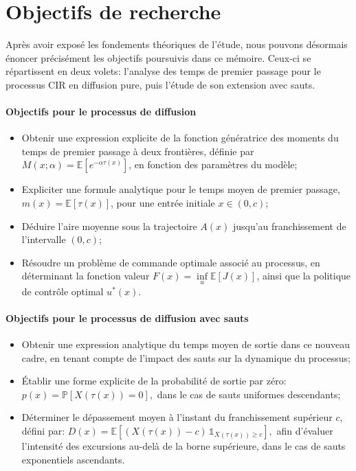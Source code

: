 \section{Objectifs de recherche}  %

Après avoir exposé les fondements théoriques de l'étude, nous pouvons désormais énoncer précisément les objectifs poursuivis dans ce mémoire. Ceux-ci se répartissent en deux volets: l'analyse des temps de premier passage pour le processus \acs{CIR} en diffusion pure, puis l'étude de son extension avec sauts.
\paragraph{Objectifs pour le processus de diffusion}
\begin{itemize}
    \item Obtenir une expression explicite de la fonction génératrice des moments du temps de premier passage à deux frontières, définie par \( M(x;\alpha) = \mathds{E}[e^{-\alpha \tau(x)}] \), en fonction des paramètres du modèle;
    \item Expliciter une formule analytique pour le temps moyen de premier passage, \( m(x) = \mathds{E}[\tau(x)] \), pour une entrée initiale \( x \in (0,c) \);
    \item Déduire l'aire moyenne sous la trajectoire $A(x)$ jusqu'au franchissement de l'intervalle \( (0,c) \);
    \item Résoudre un problème de commande optimale associé au processus, en déterminant la fonction valeur \( F(x) = \underset{u}{\inf}\mathds{E}[J(x)] \), ainsi que la politique de contrôle optimal $u^*(x)$.
\end{itemize}
\paragraph{Objectifs pour le processus de diffusion avec sauts}
\begin{itemize}
    \item Obtenir une expression analytique du temps moyen de sortie dans ce nouveau cadre, en tenant compte de l'impact des sauts sur la dynamique du processus;
    \item Établir une forme explicite de la probabilité de sortie par zéro:
    \(
    p(x) = \mathds{P}[X(\tau(x)) = 0],
    \)
    dans le cas de sauts uniformes descendants;
    \item Déterminer le dépassement moyen à l'instant du franchissement supérieur \( c \), défini par:
    \(
    D(x) = \mathds{E}[(X(\tau(x)) - c)\, \mathds{1}_{X(\tau(x)) \geq c}],
    \)
    afin d'évaluer l'intensité des excursions au-delà de la borne supérieure, dans le cas de sauts exponentiels ascendants.
\end{itemize}


